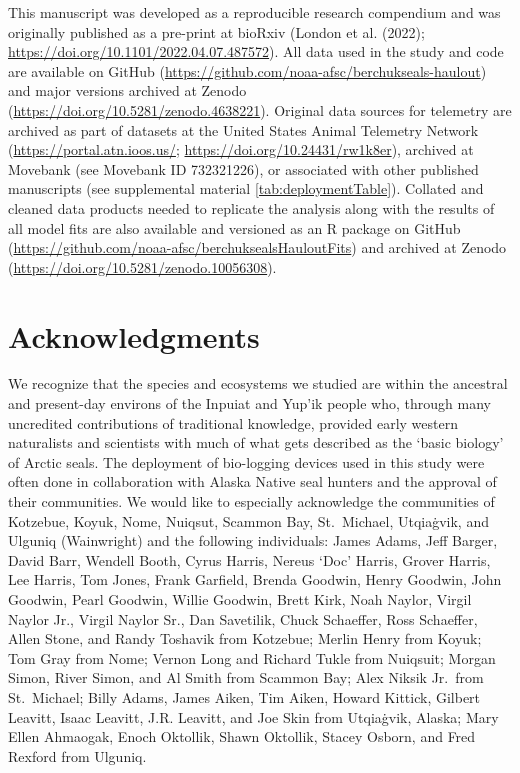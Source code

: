 \documentclass[fleqn,10pt,lineno]{wlpeerj} %
\begin{document}
This manuscript was developed as a reproducible research compendium and was
originally published as a pre-print at bioRxiv (London et al. (2022);
\url{https://doi.org/10.1101/2022.04.07.487572}). All data used in the study and code
are available on GitHub (\url{https://github.com/noaa-afsc/berchukseals-haulout}) and
major versions archived at Zenodo (\url{https://doi.org/10.5281/zenodo.4638221}).
Original data sources for telemetry are archived as part of datasets at
the United States Animal Telemetry Network (\url{https://portal.atn.ioos.us/};
\url{https://doi.org/10.24431/rw1k8er}), archived at Movebank (see
Movebank ID 732321226), or associated
with other published manuscripts (see supplemental material
\ref{tab:deploymentTable}). Collated and cleaned data products needed to
replicate the analysis along with the results of all model fits are also
available and versioned as an R package on GitHub
(\url{https://github.com/noaa-afsc/berchuksealsHauloutFits}) and archived at Zenodo
(\url{https://doi.org/10.5281/zenodo.10056308}).

\section*{Acknowledgments}\label{acknowledgments}

We recognize that the species and ecosystems we studied are within the ancestral
and present-day environs of the Inpuiat and Yup'ik people who, through many
uncredited contributions of traditional knowledge, provided early western
naturalists and scientists with much of what gets described as the `basic
biology' of Arctic seals. The deployment of bio-logging devices used in this
study were often done in collaboration with Alaska Native seal hunters and the
approval of
their communities. We would like to especially acknowledge the communities of
Kotzebue, Koyuk, Nome, Nuiqsut, Scammon Bay, St.~Michael, Utqiaġvik, and Ulguniq
(Wainwright) and the following individuals: James Adams, Jeff Barger, David
Barr, Wendell Booth, Cyrus Harris, Nereus `Doc' Harris, Grover Harris, Lee
Harris, Tom Jones, Frank Garfield, Brenda Goodwin, Henry Goodwin, John Goodwin,
Pearl Goodwin, Willie Goodwin, Brett Kirk, Noah Naylor, Virgil Naylor Jr.,
Virgil Naylor Sr., Dan Savetilik, Chuck Schaeffer, Ross Schaeffer, Allen Stone,
and Randy Toshavik from Kotzebue; Merlin Henry from Koyuk; Tom
Gray from Nome; Vernon Long and Richard Tukle from Nuiqsuit; Morgan
Simon, River Simon, and Al Smith from Scammon Bay; Alex Niksik Jr.~from
St.~Michael; Billy Adams, James Aiken, Tim Aiken, Howard Kittick,
Gilbert Leavitt, Isaac Leavitt, J.R. Leavitt, and Joe Skin from Utqiaġvik,
Alaska; Mary Ellen Ahmaogak, Enoch Oktollik, Shawn Oktollik, Stacey Osborn, and
Fred Rexford from Ulguniq.
\end{document}

